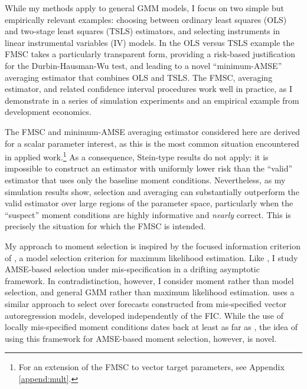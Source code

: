 While my methods apply to general GMM models, I focus on two simple but empirically relevant examples: choosing between ordinary least squares (OLS) and two-stage least squares (TSLS) estimators, and selecting instruments in linear instrumental variables (IV) models. 
In the OLS versus TSLS example the FMSC takes a particularly transparent form, providing a risk-based justification for the Durbin-Hausman-Wu test, and leading to a novel ``minimum-AMSE'' averaging estimator that combines OLS and TSLS.
The FMSC, averaging estimator, and related confidence interval procedures work well in practice, as I demonstrate in a series of simulation experiments and an empirical example from development economics.

The FMSC and minimum-AMSE averaging estimator considered here are derived for a scalar parameter interest, as this is the most common situation encountered in applied work.\footnote{For an extension of the FMSC to vector target parameters, see Appendix \ref{append:mult}.}
As a consequence, Stein-type results do not apply: it is impossible to construct an estimator with uniformly lower risk than the ``valid'' estimator that uses only the baseline moment conditions.
Nevertheless, as my simulation results show, selection and averaging can substantially outperform the valid estimator over large regions of the parameter space, particularly when the ``suspect'' moment conditions are highly informative and \emph{nearly} correct.
This is precisely the situation for which the FMSC is intended.

My approach to moment selection is inspired by the focused information criterion of \citet{ClaeskensHjort2003}, a model selection criterion for maximum likelihood estimation. 
Like \citet{ClaeskensHjort2003}, I study AMSE-based selection under mis-specification in a drifting asymptotic framework. 
In contradistinction, however, I consider moment rather than model selection, and general GMM rather than maximum likelihood estimation.
\cite{Schorfheide2005} uses a similar approach to select over forecasts constructed from mis-specified vector autoregression models, developed independently of the FIC. 
While the use of locally mis-specified moment conditions dates back at least as far as \cite{Newey1985}, the idea of using this framework for AMSE-based moment selection, however, is novel.

